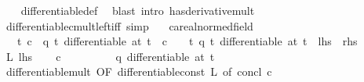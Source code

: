\begin{isabellebody}
%
\isadelimproof
\ \ %
\endisadelimproof
%
\isatagproof
{}\isamarkupfalse%
\ differentiable{\isacharunderscore}{\kern0pt}def\ \isamarkupfalse%
\ {\isacharparenleft}{\kern0pt}blast\ intro{\isacharcolon}{\kern0pt}\ has{\isacharunderscore}{\kern0pt}derivative{\isacharunderscore}{\kern0pt}mult{\isacharparenright}{\kern0pt}%
\endisatagproof
{\isafoldproof}%
%
\isadelimproof
\isanewline
%
\endisadelimproof
\isanewline
{}\isamarkupfalse%
\ differentiable{\isacharunderscore}{\kern0pt}cmult{\isacharunderscore}{\kern0pt}left{\isacharunderscore}{\kern0pt}iff\ {\isacharbrackleft}{\kern0pt}simp{\isacharbrackright}{\kern0pt}{\isacharcolon}{\kern0pt}\isanewline
\ \ \ c{\isacharcolon}{\kern0pt}{\isacharcolon}{\kern0pt}{\isachardoublequoteopen}{\isacharprime}{\kern0pt}a{\isacharcolon}{\kern0pt}{\isacharcolon}{\kern0pt}real{\isacharunderscore}{\kern0pt}normed{\isacharunderscore}{\kern0pt}field{\isachardoublequoteclose}\ \isanewline
\ \ \ {\isachardoublequoteopen}{\isacharparenleft}{\kern0pt}{\isasymlambda}t{\isachardot}{\kern0pt}\ c\ {\isacharasterisk}{\kern0pt}\ q\ t{\isacharparenright}{\kern0pt}\ differentiable\ at\ t\ {\isasymlongleftrightarrow}\ c\ {\isacharequal}{\kern0pt}\ {}\ {\isasymor}\ {\isacharparenleft}{\kern0pt}{\isasymlambda}t{\isachardot}{\kern0pt}\ q\ t{\isacharparenright}{\kern0pt}\ differentiable\ at\ t{\isachardoublequoteclose}\ {\isacharparenleft}{\kern0pt}\ {\isachardoublequoteopen}{\isacharquery}{\kern0pt}lhs\ {\isacharequal}{\kern0pt}\ {\isacharquery}{\kern0pt}rhs{\isachardoublequoteclose}{\isacharparenright}{\kern0pt}\isanewline
%
\isadelimproof
%
\endisadelimproof
%
\isatagproof
{}\isamarkupfalse%
\isanewline
\ \ \isamarkupfalse%
\ L{\isacharcolon}{\kern0pt}\ {\isacharquery}{\kern0pt}lhs\isanewline
\ \ \isacommand{{\isacharbraceleft}{\kern0pt}}\isamarkupfalse%
\isamarkupfalse%
\ {\isachardoublequoteopen}c\ {\isasymnoteq}\ {}{\isachardoublequoteclose}\isanewline
\ \ \ \ \isamarkupfalse%
\ \isamarkupfalse%
\ {\isachardoublequoteopen}q\ differentiable\ at\ t{\isachardoublequoteclose}\isanewline
\ \ \ \ \ \ \isamarkupfalse%
\ differentiable{\isacharunderscore}{\kern0pt}mult\ {\isacharbrackleft}{\kern0pt}OF\ differentiable{\isacharunderscore}{\kern0pt}const\ L{\isacharcomma}{\kern0pt}\ of\ concl{\isacharcolon}{\kern0pt}\ {\isachardoublequoteopen}{}{\isacharslash}{\kern0pt}c{\isachardoublequoteclose}{\isacharbrackright}{\kern0pt}\ \isamarkupfalse%

\end{isabellebody}
